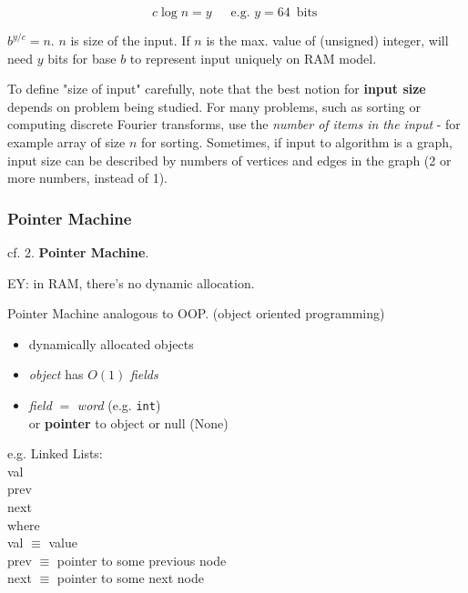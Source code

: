 \documentclass[10pt]{amsart}
\begin{document}
\[
c \log{n} =  y \quad \, \text{ e.g. } y = 64 \, \text{ bits }
\]

$b^{y/c} = n$. $n$ is size of the input. If $n$ is the max. value of (unsigned) integer, will need $y$ bits for base $b$ to represent input uniquely on RAM model.

To define "size of input" carefully, note that the best notion for \textbf{input size} depends on problem being studied. For many problems, such as sorting or computing discrete Fourier transforms, use the \emph{number of items in the input} - for example array of size $n$ for sorting. Sometimes, if input to algorithm is a graph, input size can be described by numbers of vertices and edges in the graph (2 or more numbers, instead of 1).



\subsubsection{Pointer Machine}

cf. 2. \textbf{Pointer Machine}.

EY: in RAM, there's no dynamic allocation.

Pointer Machine analogous to OOP. (object oriented programming)

\begin{itemize}
	\item dynamically allocated objects 
	\item \emph{object} has $O(1)$ \emph{fields}
	\item \emph{field} $=$ \emph{word} (e.g. \texttt{int}) \\
	or \textbf{pointer} to object or null (None)
\end{itemize}

e.g. Linked Lists: \\

val \\
prev \\
next \\

where \\
val $\equiv $ value \\
prev $\equiv $ pointer to some previous node \\
next $\equiv $ pointer to some next node \\


\end{document}
